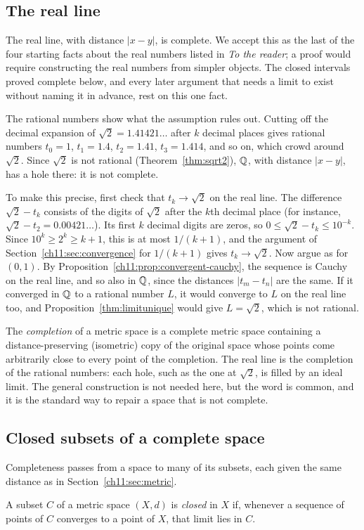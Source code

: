 \subsection*{The real line}
The real line, with distance $|x-y|$, is complete. We accept this as the last of the four starting facts about the real numbers listed in \emph{To the reader}; a proof would require constructing the real numbers from simpler objects. The closed intervals proved complete below, and every later argument that needs a limit to exist without naming it in advance, rest on this one fact.

The rational numbers show what the assumption rules out. Cutting off the decimal expansion of $\sqrt2=1.41421\ldots$ after $k$ decimal places gives rational numbers $t_0=1$, $t_1=1.4$, $t_2=1.41$, $t_3=1.414$, and so on, which crowd around $\sqrt2$. Since $\sqrt2$ is not rational (Theorem~\ref{thm:sqrt2}), $\mathbb Q$, with distance $|x-y|$, has a hole there: it is not complete.

To make this precise, first check that $t_k\to\sqrt2$ on the real line. The difference $\sqrt2-t_k$ consists of the digits of $\sqrt2$ after the $k$th decimal place (for instance, $\sqrt2-t_2=0.00421\ldots$). Its first $k$ decimal digits are zeros, so $0\le\sqrt2-t_k\le10^{-k}$. Since $10^k\ge2^k\ge k+1$, this is at most $1/(k+1)$, and the argument of Section~\ref{ch11:sec:convergence} for $1/(k+1)$ gives $t_k\to\sqrt2$. Now argue as for $(0,1)$. By Proposition~\ref{ch11:prop:convergent-cauchy}, the sequence is Cauchy on the real line, and so also in $\mathbb Q$, since the distances $|t_m-t_n|$ are the same. If it converged in $\mathbb Q$ to a rational number $L$, it would converge to $L$ on the real line too, and Proposition~\ref{thm:limitunique} would give $L=\sqrt2$, which is not rational.

The \emph{completion} of a metric space is a complete metric space containing a distance-preserving (isometric) copy of the original space whose points come arbitrarily close to every point of the completion. The real line is the completion of the rational numbers: each hole, such as the one at $\sqrt2$, is filled by an ideal limit. The general construction is not needed here, but the word is common, and it is the standard way to repair a space that is not complete.

\subsection*{Closed subsets of a complete space}
Completeness passes from a space to many of its subsets, each given the same distance as in Section~\ref{ch11:sec:metric}.
\par\noindent\begin{minipage}{\linewidth}
\begin{definition}\label{ch11:def:closed}
A subset $C$ of a metric space $(X,d)$ is \emph{closed} in $X$ if, whenever a sequence of points of $C$ converges to a point of $X$, that limit lies in $C$.
\end{definition}
\end{minipage}\par

